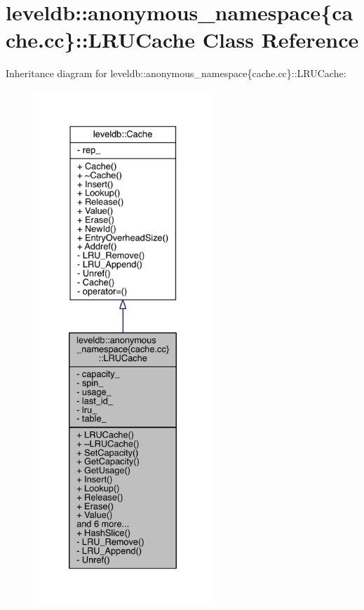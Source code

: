 \hypertarget{classleveldb_1_1anonymous__namespace_02cache_8cc_03_1_1_l_r_u_cache}{}\section{leveldb\+:\+:anonymous\+\_\+namespace\{cache.\+cc\}\+:\+:L\+R\+U\+Cache Class Reference}
\label{classleveldb_1_1anonymous__namespace_02cache_8cc_03_1_1_l_r_u_cache}


Inheritance diagram for leveldb\+:\+:anonymous\+\_\+namespace\{cache.\+cc\}\+:\+:L\+R\+U\+Cache\+:
\nopagebreak
\begin{figure}[H]
\begin{center}
\leavevmode
\includegraphics[height=550pt]{classleveldb_1_1anonymous__namespace_02cache_8cc_03_1_1_l_r_u_cache__inherit__graph}
\end{center}
\end{figure}


